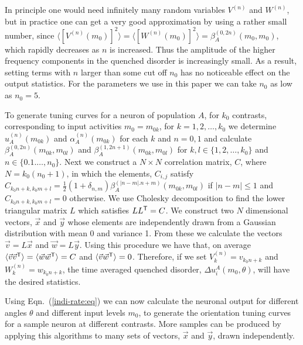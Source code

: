 In principle one would need infinitely many random variables $V^{(n)}$ and 
$W^{(n)}$, but in practice one can get a very good approximation by using a 
rather small number, since $\langle [V^{(n)}(m_0)]^2\rangle=
\langle [W^{(n)}(m_0)]^2\rangle=\beta_{A}^{(0,2n)}(m_0,m_0)$, which rapidly 
decreases as $n$ is increased. Thus the 
amplitude of the higher frequency components in the quenched disorder is 
increasingly small. As a result, setting terms with $n$ larger than some cut 
off $n_0$ has no noticeable effect on the output statistics.
For the parameters we use in this paper we can take $n_0$ as low as $n_0=5$\@.

To generate tuning curves for a neuron of population $A$, for 
$k_0$ contrasts, corresponding to input activities $m_0=m_{0k}$, for 
$k=1,2,\ldots,k_0$ we determine $u_A^{(n)}(m_{0k})$ and 
$\alpha_{A}^{(n)}(m_{0k})$ for each $k$ and $n=0,1$ and calculate
$\beta_A^{(0,2n)}(m_{0k},m_{0l})$ and 
$\beta_A^{(1,2n+1)}(m_{0k},m_{0l})$ for $k,l \in \{1,2,\ldots,k_0\}$
and $n\in \{0.1.\ldots,n_0\}$\@. Next we construct a $N\times N$ correlation 
matrix, $C$, where $N=k_0(n_0+1)$, in which the elements, $C_{i,j}$ satisfy
$C_{k_0n+k,k_0m+l}=\frac{1}{2}(1+\delta_{n,m})\beta_A^{(|n-m|.n+m)}
(m_{0k},m_{0l})$ if $|n-m|\leq 1$ and $C_{k_0n+k,k_0m+l}=0$ otherwise. 
We use Cholesky decomposition \cite{Horn1985} to find the lower triangular matrix 
$L$ which satisfies $LL^{\sf T}=C$\@. We construct two $N$ dimensional vectors, 
$\vec{x}$ and $\vec{y}$ whose elements are independently drawn from a Gaussian 
distribution with mean 0 and variance 1.
From these we calculate the vectors $\vec{v}=L\vec{x}$ and $\vec{w}=L\vec{y}$\@.
Using this procedure we have that, on average $\langle\vec{v}\vec{v}^{\sf T}
\rangle=\langle\vec{w}\vec{w}^{\sf T}\rangle=C$ and $\langle\vec{v}
\vec{w}^{\sf T}\rangle=0$\@.
Therefore, if we set $V_k^{(n)}=v_{k_0n+k}$ and $W_k^{(n)}=w_{k_0n+k}$, the 
time averaged quenched disorder, $\Delta u_i^A(m_0,\theta)$, will have the desired 
statistics. 

Using Eqn.~(\ref{indi-rate:eq}) we can now calculate the neuronal output for
different angles $\theta$ and different input levels $m_0$, to generate the
orientation tuning curves for a sample neuron at different contrasts.
More samples can be produced by applying this algorithms to many sets
of vectors, $\vec{x}$ and $\vec{y}$, drawn independently.

